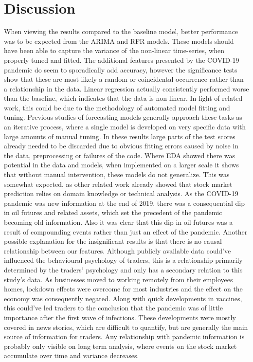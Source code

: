 \section{Discussion}
\label{sec:dis}
When viewing the results compared to the baseline model, better performance was to be expected from the ARIMA and RFR models. These models should have been able to capture the variance of the non-linear time-series, when properly tuned and fitted. The additional features presented by the COVID-19 pandemic do seem to sporadically add accuracy, however the significance tests show that these are most likely a random or coincidental occurrence rather than a relationship in the data. Linear regression actually consistently performed worse than the baseline, which indicates that the data is non-linear.
In light of related work, this could be due to the methodology of automated model fitting and tuning. Previous studies of forecasting models generally approach these tasks as an iterative process, where a single model is developed on very specific data with large amounts of manual tuning. In these results large parts of the test scores already needed to be discarded due to obvious fitting errors caused by noise in the data, preprocessing or failures of the code. Where EDA showed there was potential in the data and models, when implemented on a larger scale it shows that without manual intervention, these models do not generalize. This was somewhat expected, as other related work already showed that stock market prediction relies on domain knowledge or technical analysis. %
As the COVID-19 pandemic was new information at the end of 2019, there was a consequential dip in oil futures and related assets, which set the precedent of the pandemic becoming old information. Also it was clear that this dip in oil futures was a result of compounding events rather than just an effect of the pandemic. Another possible explanation for the insignificant results is that there is no causal relationship between our features. Although publicly available data could've influenced the behavioural psychology of traders, this is a relationship primarily determined by the traders' psychology and only has a secondary relation to this study's data. As businesses moved to working remotely from their employees homes, lockdown effects were overcome for most industries and the effect on the economy was consequently negated. Along with quick developments in vaccines, this could've led traders to the conclusion that the pandemic was of little importance after the first wave of infections. These developments were mostly covered in news stories, which are difficult to quantify, but are generally the main source of information for traders. Any relationship with pandemic information is probably only visible on long term analysis, where events on the stock market accumulate over time and variance decreases.
